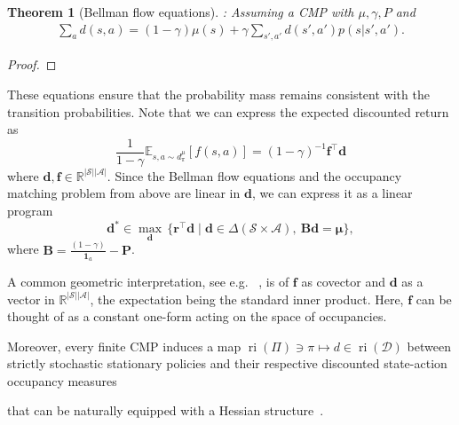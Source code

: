 \documentclass{article}
\theoremstyle{plain}
\newtheorem{theorem}{Theorem}[section]
\theoremstyle{definition}
\theoremstyle{remark}
\newcommand{\sS}{\mathcal{S}}
\newcommand{\sA}{\mathcal{A}}
\begin{document}
\begin{theorem}[Bellman flow equations]:
Assuming a CMP with $\mu,\gamma,P$ and 
\begin{align*}
    \sum_a d(s,a) = (1-\gamma) \mu(s) +
    \gamma \sum_{s', a'} d(s', a')p(s|s',a').
\end{align*}
\end{theorem}
\begin{proof}
    
\end{proof}
These equations ensure that the probability mass remains consistent with the transition probabilities. Note that we can express the expected discounted return as
\begin{equation}\frac{1}{1-\gamma}\mathbb{E}_{s, a \sim d^\mu_\pi} [f(s, a)] = (1-\gamma)^{-1}\boldsymbol{f}^\top \boldsymbol{d}\end{equation}
where $\boldsymbol{d},\boldsymbol{f}\in\mathbb{R}^{|\sS||\sA|}$. 
Since the Bellman flow equations and the occupancy matching problem from above are linear in $\boldsymbol{d}$, we can express it as a linear program
\begin{equation}\label{eq:lin-program}
    \boldsymbol{d^*} \in \max_{\boldsymbol{d}}\, \{\boldsymbol{r}^\top \boldsymbol{d}
    \mid \boldsymbol{d} \in \Delta(\sS\times\sA),\ \boldsymbol{B}\boldsymbol{d}=\boldsymbol{\mu}\},
\end{equation}
where $\boldsymbol{B}= \frac{(1-\gamma)}{\boldsymbol{1}_{a}}-\boldsymbol{P}$.

A common geometric interpretation, see e.g. ~\citep{ay2017information}, is of $\boldsymbol{f}$ as covector and $\boldsymbol{d}$ as a vector in $\mathbb{R}^{|\mathcal{S}||\mathcal{A}|}$, the expectation being the standard inner product. Here, $\boldsymbol{f}$ can be thought of as a constant one-form acting on the space of occupancies.

Moreover, every finite CMP induces a map $\operatorname{ri}(\Pi)\ni\pi\mapsto d\in\operatorname{ri}(\mathcal{D})$ between strictly stochastic stationary policies and their respective discounted state-action occupancy measures

that can be naturally equipped with a Hessian structure~\citep{muller2023geometry}.
\end{document}
